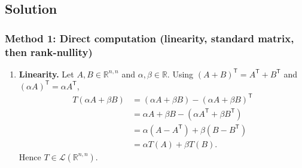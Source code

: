 \documentclass[12pt]{article}
\newcommand{\R}{\mathbb{R}}
\newcommand{\cL}{\mathcal{L}}
\begin{document}
\subsection{Solution}

\subsubsection{Method 1: Direct computation (linearity, standard matrix, then rank-nullity)}
\begin{enumerate}[label=(\alph*)]
\item \textbf{Linearity.}
Let $A,B\in\R^{n,n}$ and $\alpha,\beta\in\R$. Using $(A+B)^{\mathsf{T}}=A^{\mathsf{T}}+B^{\mathsf{T}}$ and $(\alpha A)^{\mathsf{T}}=\alpha A^{\mathsf{T}}$,
\begin{align*}
T(\alpha A+\beta B)
&=(\alpha A+\beta B)-(\alpha A+\beta B)^{\mathsf{T}}\\
&=\alpha A+\beta B - (\alpha A^{\mathsf{T}}+\beta B^{\mathsf{T}})\\
&=\alpha(A-A^{\mathsf{T}})+\beta(B-B^{\mathsf{T}})\\
&=\alpha T(A)+\beta T(B).
\end{align*}
Hence $T\in\cL(\R^{n,n})$.


\end{enumerate}
\end{document}
